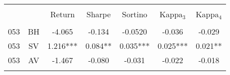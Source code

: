 \begin{tabular}{@{\extracolsep{5pt}} Hcccccc} 
\\[-1.8ex]\hline 
\hline \\[-1.8ex] 
 &  & Return & Sharpe & Sortino & Kappa$_{3}$ & Kappa$_{4}$ \\ 
\hline \\[-1.8ex] 
053 & BH & -4.065 & -0.134 & -0.0520 & -0.036 & -0.029 \\ 
053 & SV & 1.216*** & 0.084** & 0.035*** & 0.025*** & 0.021** \\ 
053 & AV & -1.467 & -0.080 & -0.031 & -0.022 & -0.018 \\ 
\hline \\[-1.8ex] 
\end{tabular} 